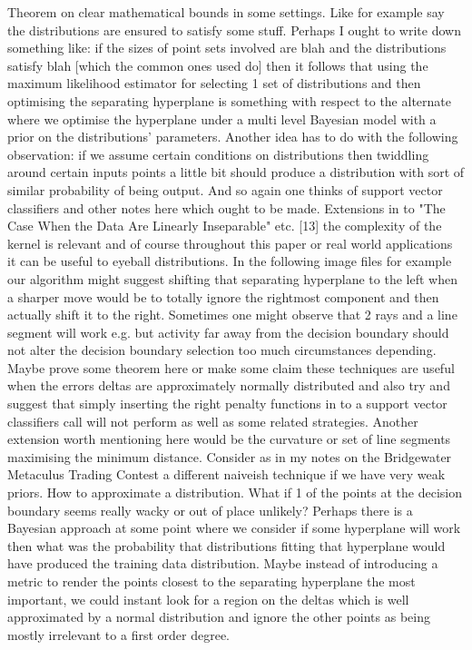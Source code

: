Theorem on clear mathematical bounds in some settings. Like for example say the distributions are ensured to satisfy some stuff. Perhaps I ought to write down something like: if the sizes of point sets involved are blah and the distributions satisfy blah [which the common ones used do] then it follows that using the maximum likelihood estimator for selecting 1 set of distributions and then optimising the separating hyperplane is something with respect to the alternate where we optimise the hyperplane under a multi level Bayesian model with a prior on the distributions' parameters. Another idea has to do with the following observation: if we assume certain conditions on distributions then twiddling around certain inputs points a little bit should produce a distribution with sort of similar probability of being output. And so again one thinks of support vector classifiers and other notes here which ought to be made. Extensions in to "The Case When the Data Are Linearly Inseparable" etc. [13] the complexity of the kernel is relevant and of course throughout this paper or real world applications it can be useful to eyeball distributions. In the following image files for example our algorithm might suggest shifting that separating hyperplane to the left when a sharper move would be to totally ignore the rightmost component and then actually shift it to the right. Sometimes one might observe that 2 rays and a line segment will work e.g. but activity far away from the decision boundary should not alter the decision boundary selection too much circumstances depending. Maybe prove some theorem here or make some claim these techniques are useful when the errors deltas are approximately normally distributed and also try and suggest that simply inserting the right penalty functions in to a support vector classifiers call will not perform as well as some related strategies. Another extension worth mentioning here would be the curvature or set of line segments maximising the minimum distance. Consider as in my notes on the Bridgewater Metaculus Trading Contest a different naiveish technique if we have very weak priors. How to approximate a distribution. What if 1 of the points at the decision boundary seems really wacky or out of place unlikely? Perhaps there is a Bayesian approach at some point where we consider if some hyperplane will work then what was the probability that distributions fitting that hyperplane would have produced the training data distribution. Maybe instead of introducing a metric to render the points closest to the separating hyperplane the most important, we could instant look for a region on the deltas which is well approximated by a normal distribution and ignore the other points as being mostly irrelevant to a first order degree.

